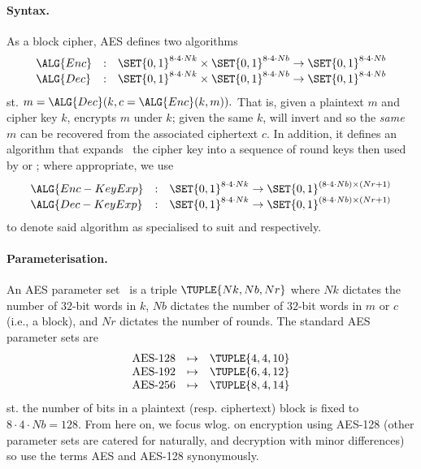

\paragraph{Syntax.}

As a block cipher, AES defines two algorithms
\[
\begin{array}{lcl}
\ALG{Enc} &:& \SET{ 0, 1 }^{8 \cdot 4 \cdot Nk} \times \SET{ 0, 1 }^{8 \cdot 4 \cdot Nb} \rightarrow \SET{ 0, 1 }^{8 \cdot 4 \cdot Nb} \\
\ALG{Dec} &:& \SET{ 0, 1 }^{8 \cdot 4 \cdot Nk} \times \SET{ 0, 1 }^{8 \cdot 4 \cdot Nb} \rightarrow \SET{ 0, 1 }^{8 \cdot 4 \cdot Nb} \\
\end{array}
\]
st.
$
m = \ALG{Dec}( k, c = \ALG{Enc}( k, m ) ) .
$
That is, given a plaintext $m$ and cipher key $k$,  encrypts $m$ 
under $k$; given the same $k$,  will invert  and so the
{\em same} $m$ can be recovered from the associated ciphertext $c$.  
In addition, it defines an algorithm
that expands~\cite[Section 5.2]{FIPS:197} the cipher key into a sequence 
of round keys then used by
or
;
where appropriate, we use
\[
\begin{array}{lcl}
\ALG{Enc-KeyExp} &:& \SET{ 0, 1 }^{8 \cdot 4 \cdot Nk} \rightarrow \SET{ 0, 1 }^{( 8 \cdot 4 \cdot Nb ) \times ( Nr + 1 )} \\
\ALG{Dec-KeyExp} &:& \SET{ 0, 1 }^{8 \cdot 4 \cdot Nk} \rightarrow \SET{ 0, 1 }^{( 8 \cdot 4 \cdot Nb ) \times ( Nr + 1 )} \\
\end{array}
\]
to denote said algorithm as specialised to suit
and
respectively.


\paragraph{Parameterisation.}

An AES parameter set~\cite[Figure 4]{FIPS:197}
is a triple
$
\TUPLE{ Nk, Nb, Nr }
$
where 
$Nk$ dictates the number of $32$-bit words in $k$,
$Nb$ dictates the number of $32$-bit words in $m$ or $c$ (i.e., a block),
and
$Nr$ dictates the number of rounds.  The standard AES parameter sets are
\[
\begin{array}{lcl}
\mbox{AES-128} &\mapsto& \TUPLE{ 4, 4, 10 } \\
\mbox{AES-192} &\mapsto& \TUPLE{ 6, 4, 12 } \\
\mbox{AES-256} &\mapsto& \TUPLE{ 8, 4, 14 } \\
\end{array}
\]
st. the number of bits in a plaintext (resp. ciphertext) block is fixed to 
$
8 \cdot 4 \cdot Nb = 128 .
$
From here on, we focus wlog. on encryption using AES-128 (other parameter 
sets are catered for naturally, and decryption with minor differences) so
use the terms AES and AES-128 synonymously.

